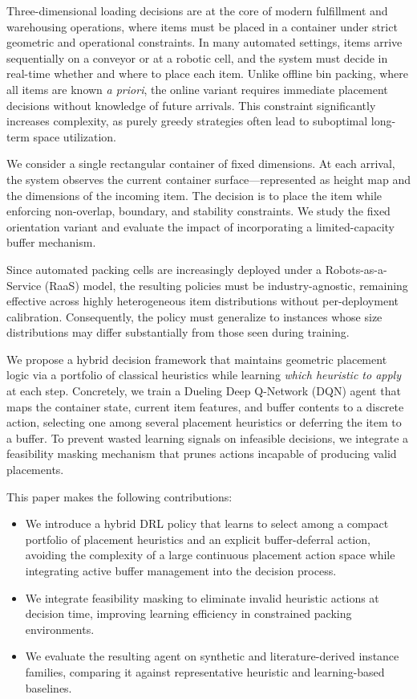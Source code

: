 \documentclass[runningheads]{llncs}
\begin{document}
Three-dimensional loading decisions are at the core of modern fulfillment and warehousing operations, where items must be placed in a container under strict geometric and operational constraints. In many automated settings, items arrive sequentially on a conveyor or at a robotic cell, and the system must decide in real-time whether and where to place each item. Unlike offline bin packing, where all items are known \textit{a priori}, the online variant requires immediate placement decisions without knowledge of future arrivals. This constraint significantly increases complexity, as purely greedy strategies often lead to suboptimal long-term space utilization.

We consider a single rectangular container of fixed dimensions. At each arrival, the system observes the current container surface—represented as height map and the dimensions of the incoming item. The decision is to place the item while enforcing non-overlap, boundary, and stability constraints. We study the fixed orientation variant and evaluate the impact of incorporating a limited-capacity buffer mechanism.

Since automated packing cells are increasingly deployed under a Robots-as-a-Service (RaaS) model, the resulting policies must be industry-agnostic, remaining effective across highly heterogeneous item distributions without per-deployment calibration. Consequently, the policy must generalize to instances whose size distributions may differ substantially from those seen during training.

We propose a hybrid decision framework that maintains geometric placement logic via a portfolio of classical heuristics while learning \emph{which heuristic to apply} at each step. Concretely, we train a Dueling Deep Q-Network (DQN) agent \cite{Mnih2015NatureDQN,Wang2016Dueling} that maps the container state, current item features, and buffer contents to a discrete action, selecting one among several placement heuristics or deferring the item to a buffer. To prevent wasted learning signals on infeasible decisions, we integrate a feasibility masking mechanism that prunes actions incapable of producing valid placements.

This paper makes the following contributions:
\begin{itemize}
    \item We introduce a hybrid DRL policy that learns to select among a compact portfolio of placement heuristics and an explicit buffer-deferral action, avoiding the complexity of a large continuous placement action space while integrating active buffer management into the decision process.
    \item We integrate feasibility masking to eliminate invalid heuristic actions at decision time, improving learning efficiency in constrained packing environments.
    \item We evaluate the resulting agent on synthetic and literature-derived instance families, comparing it against representative heuristic and learning-based baselines.
\end{itemize}
\end{document}
